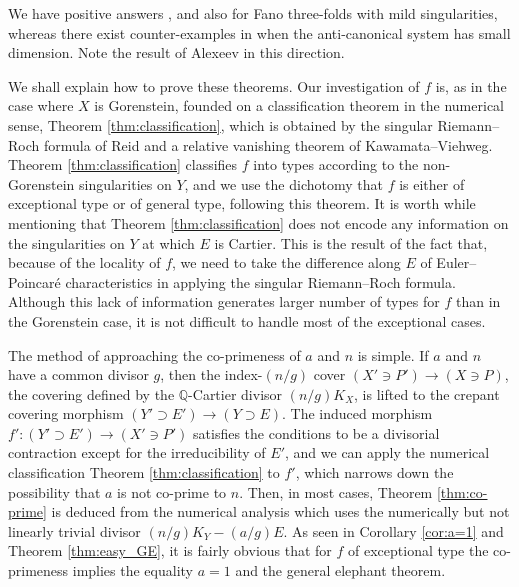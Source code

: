 \documentclass[a4paper,11pt]{amsart}
\theoremstyle{definition}
\theoremstyle{remark}
\numberwithin{equation}{section}
\newcommand{\bQ}{{\mathbb Q}}
\begin{document}
We have positive answers \cite{Re83p}, \cite{Sh79} and \cite{Ta02}
also for Fano three-folds with mild singularities,
whereas there exist counter-examples in \cite{ABR03}
when the anti-canonical system has small dimension.
Note the result \cite{Al94} of Alexeev in this direction.

We shall explain how to prove these theorems.
Our investigation of $f$ is, as in the case where $X$ is Gorenstein,
founded on a classification theorem in the numerical sense,
Theorem \ref{thm:classification},
which is obtained by
the singular Riemann--Roch formula \cite[Theorem 10.2]{Re87} of Reid and
a relative vanishing theorem \cite[Theorem 1-2-5]{KMM87} of Kawamata--Viehweg.
Theorem \ref{thm:classification} classifies $f$ into types according to
the non-Gorenstein singularities on $Y$,
and we use the dichotomy that
$f$ is either of exceptional type or of general type,
following this theorem.
It is worth while mentioning that
Theorem \ref{thm:classification} does not encode
any information on the singularities on $Y$ at which $E$ is Cartier.
This is the result of the fact that,
because of the locality of $f$,
we need to take the difference along $E$ of Euler--Poincar\'e characteristics
in applying the singular Riemann--Roch formula.
Although this lack of information generates
larger number of types for $f$ than in the Gorenstein case,
it is not difficult to handle most of the exceptional cases.

The method of approaching the co-primeness of $a$ and $n$ is simple.
If $a$ and $n$ have a common divisor $g$,
then the index-$(n/g)$ cover $(X' \ni P') \to (X \ni P)$,
the covering defined by the $\bQ$-Cartier divisor $(n/g)K_X$,
is lifted to the crepant covering morphism $(Y' \supset E') \to (Y \supset E)$.
The induced morphism $f' \colon (Y' \supset E') \to (X' \ni P')$
satisfies the conditions to be a divisorial contraction
except for the irreducibility of $E'$,
and we can apply the numerical classification Theorem \ref{thm:classification}
to $f'$,
which narrows down the possibility that $a$ is not co-prime to $n$.
Then, in most cases,
Theorem \ref{thm:co-prime} is deduced from the numerical analysis
which uses the numerically but not linearly trivial divisor $(n/g)K_Y-(a/g)E$.
As seen in Corollary \ref{cor:a=1} and Theorem \ref{thm:easy_GE},
it is fairly obvious that for $f$ of exceptional type
the co-primeness implies the equality $a=1$ and the general elephant theorem.
\end{document}
